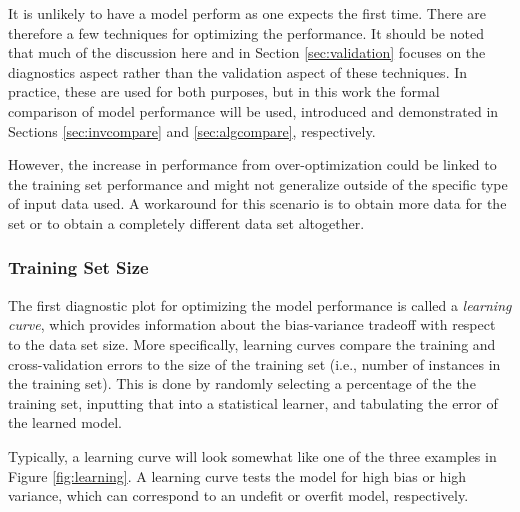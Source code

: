 It is unlikely to have a model perform as one expects the first time. There are
therefore a few techniques for optimizing the performance. It should be noted
that much of the discussion here and in Section \ref{sec:validation} focuses on
the diagnostics aspect rather than the validation aspect of these techniques.
In practice, these are used for both purposes, but in this work the formal
comparison of model performance will be used, introduced and demonstrated in
Sections \ref{sec:invcompare} and \ref{sec:algcompare}, respectively. 

However, the increase in performance from over-optimization could be linked to
the training set performance and might not generalize outside of the specific
type of input data used.  A workaround for this scenario is to obtain more data
for the set or to obtain a completely different data set altogether. 

\subsubsection{Training Set Size}

The first diagnostic plot for optimizing the model performance is called a
\textit{learning curve}, which provides information about the bias-variance
tradeoff with respect to the data set size. More specifically, learning curves
compare the training and cross-validation errors to the size of the training
set (i.e., number of instances in the training set). This is done by randomly
selecting a percentage of the the training set, inputting that into a
statistical learner, and tabulating the error of the learned model. 

Typically, a learning curve will look somewhat like one of the three examples
in Figure \ref{fig:learning}.  A learning curve tests the model for high bias
or high variance, which can correspond to an undefit or overfit model,
respectively. 

